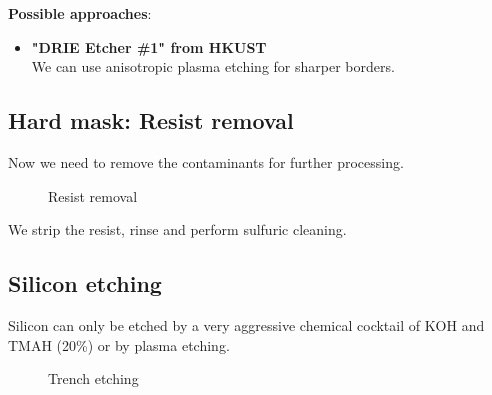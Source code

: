 \textbf{Possible approaches}:
\begin{itemize}
	\item \textbf{"DRIE Etcher \#1" from HKUST} \\
	We can use anisotropic plasma etching for sharper borders.
\end{itemize}

\subsection{Hard mask: Resist removal}

Now we need to remove the contaminants for further processing.

\begin{figure}[H]
	\centering
	\begin{tikzpicture}[node distance = 3cm, auto, thick,scale=\CrossSectionOnly, every node/.style={transform shape}]
		
	\end{tikzpicture}
	\drawStepArrow{}
	\begin{tikzpicture}[node distance = 3cm, auto, thick,scale=\CrossSectionOnly, every node/.style={transform shape}]
		
	\end{tikzpicture}
	\caption{Resist removal}
\end{figure}

We strip the resist, rinse and perform sulfuric cleaning.

\newpage

\subsection{Silicon etching}\label{sti_trench_etch}

Silicon can only be etched by a very aggressive chemical cocktail of  KOH and TMAH (20\%) or by plasma etching.

\begin{figure}[H]
	\centering
	\begin{tikzpicture}[node distance = 3cm, auto, thick,scale=\CrossSectionOnly, every node/.style={transform shape}]
		
	\end{tikzpicture}
	\drawStepArrow{}
	\begin{tikzpicture}[node distance = 3cm, auto, thick,scale=\CrossSectionOnly, every node/.style={transform shape}]
		
	\end{tikzpicture}
	\caption{Trench etching}
\end{figure}

